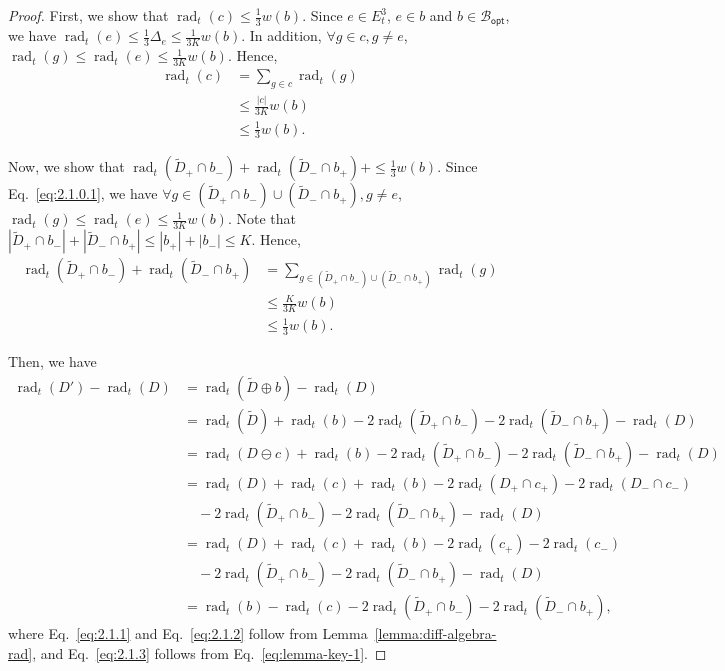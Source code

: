 \documentclass{article}
\newcommand{\Bopt}{\mathcal B_{\mathsf{opt}}}
\DeclareMathOperator{\rad}{rad}
\begin{document}
\begin{spacing}{1.1}
\begin{proof}
First, we show that $\rad_t(c) \le \frac13 w(b)$.
Since $e\in E_t^3$, $e\in b$ and $b\in \Bopt$, we have $\rad_t(e) \le \frac{1}{3}\Delta_e \le \frac{1}{3K}w(b)$.
In addition, $\forall g\in c, g\not=e$, $\rad_t(g) \le \rad_t(e)\le \frac{1}{3K}w(b)$.
Hence, 
\begin{align}
\rad_t(c) &= \sum_{g\in c} \rad_t(g) \nonumber \\
		  & \le \frac{|c|}{3K}w(b) \nonumber \\
		  &\le \frac{1}{3}w(b).\label{eq:2.1.0.2}
\end{align}

Now, we show that $\rad_t(\tilde D_+ \cap b_-)+\rad_t(\tilde D_- \cap b_+)+ \le \frac13 w(b)$.
Since Eq.~\eqref{eq:2.1.0.1}, we have $\forall g\in (\tilde D_+\cap b_-)\cup(\tilde D_-\cap b_+), g\not=e$, 
$\rad_t(g) \le \rad_t(e)\le \frac{1}{3K}w(b)$.
Note that $|\tilde D_+\cap b_-|+|\tilde D_-\cap b_+|\le |b_+|+|b_-| \le K$. 
Hence, 
\begin{align}
\rad_t(\tilde D_+ \cap b_-)+\rad_t(\tilde D_- \cap b_+) &= \sum_{g\in (\tilde D_+\cap b_-)\cup(\tilde D_-\cap b_+)} \rad_t(g) \nonumber\\
	& \le \frac{K}{3K}w(b) \nonumber \\
	& \le \frac{1}{3}w(b). \label{eq:2.1.0.3}
\end{align}

Then, we have
\begin{align}
\rad_t(D')-\rad_t(D) &= \rad_t(\tilde D \oplus b)-\rad_t(D) \\
					 &= \rad_t(\tilde D)+\rad_t(b)-2\rad_t(\tilde D_+\cap b_-)-2\rad_t(\tilde D_-\cap b_+)-\rad_t(D)
					 \label{eq:2.1.1}\\
					 &= \rad_t(D\ominus c)+\rad_t(b)-2\rad_t(\tilde D_+\cap b_-)-2\rad_t(\tilde D_-\cap b_+)-\rad_t(D)\\
					 &= \rad_t(D)+\rad_t(c)+\rad_t(b)-2\rad_t(D_+\cap c_+)-2\rad_t(D_-\cap c_-) \nonumber \\
					 &\quad -2\rad_t(\tilde D_+\cap b_-)-2\rad_t(\tilde D_-\cap b_+)-\rad_t(D)
					 \label{eq:2.1.2}\\
					 &= \rad_t(D)+\rad_t(c)+\rad_t(b)-2\rad_t(c_+)-2\rad_t(c_-) \nonumber \\
					 &\quad -2\rad_t(\tilde D_+\cap b_-)-2\rad_t(\tilde D_-\cap b_+)-\rad_t(D)
					 \label{eq:2.1.3}\\
					 &= \rad_t(b)-\rad_t(c)-2\rad_t(\tilde D_+\cap b_-)-2\rad_t(\tilde D_-\cap b_+),
\end{align}
where Eq.~\eqref{eq:2.1.1} and Eq.~\eqref{eq:2.1.2} follow from Lemma~\ref{lemma:diff-algebra-rad}, and 
Eq.~\eqref{eq:2.1.3} follows from Eq.~\eqref{eq:lemma-key-1}.


\end{proof}
\end{spacing}
\end{document}
